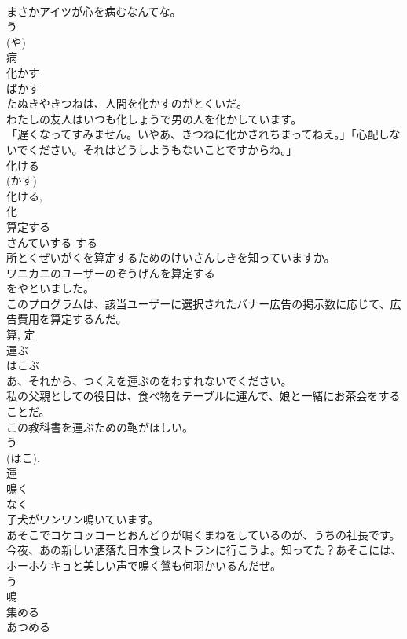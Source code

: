 \documentclass[8pt]{extreport}
\begin{document}
\begin{CJK}{UTF8}{min}
\\	まさかアイツが心を病むなんてな。	
\\	う 
\\	(や) 
\\	病	
\\	化かす	
\\	ばかす	
\\	たぬきやきつねは、人間を化かすのがとくいだ。	
\\	わたしの友人はいつも化しょうで男の人を化かしています。	
\\	「遅くなってすみません。いやあ、きつねに化かされちまってねえ。」「心配しないでください。それはどうしようもないことですからね。」	
\\	化ける 
\\	(かす) 
\\	化ける, 
\\	化	
\\	算定する	
\\	さんていする	する 
\\	所とくぜいがくを算定するためのけいさんしきを知っていますか。	
\\	ワニカニのユーザーのぞうげんを算定する
\\	をやといました。	
\\	このプログラムは、該当ユーザーに選択されたバナー広告の掲示数に応じて、広告費用を算定するんだ。	
\\	算, 定	
\\	運ぶ	
\\	はこぶ	
\\	あ、それから、つくえを運ぶのをわすれないでください。	
\\	私の父親としての役目は、食べ物をテーブルに運んで、娘と一緒にお茶会をすることだ。	
\\	この教科書を運ぶための鞄がほしい。	
\\	う 
\\	(はこ). 
\\	運	
\\	鳴く	
\\	なく	
\\	子犬がワンワン鳴いています。	
\\	あそこでコケコッコーとおんどりが鳴くまねをしているのが、うちの社長です。	
\\	今夜、あの新しい洒落た日本食レストランに行こうよ。知ってた？あそこには、ホーホケキョと美しい声で鳴く鶯も何羽かいるんだぜ。	
\\	う 
\\	鳴	
\\	集める	
\\	あつめる	

\end{CJK}
\end{document}
